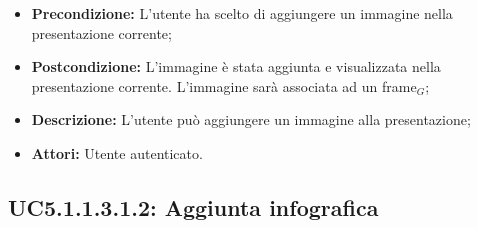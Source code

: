 \begin{itemize}
	\item \textbf{Precondizione:} L'utente ha scelto di aggiungere un immagine nella presentazione corrente;
	\item \textbf{Postcondizione:} L'immagine è stata aggiunta e visualizzata nella presentazione corrente. L'immagine sarà associata ad un frame$_G$;
	\item \textbf{Descrizione:} L'utente può aggiungere un immagine alla presentazione;
	\item \textbf{Attori:} Utente autenticato.
\end{itemize}
\subsection{ UC5.1.1.3.1.2: Aggiunta infografica}

